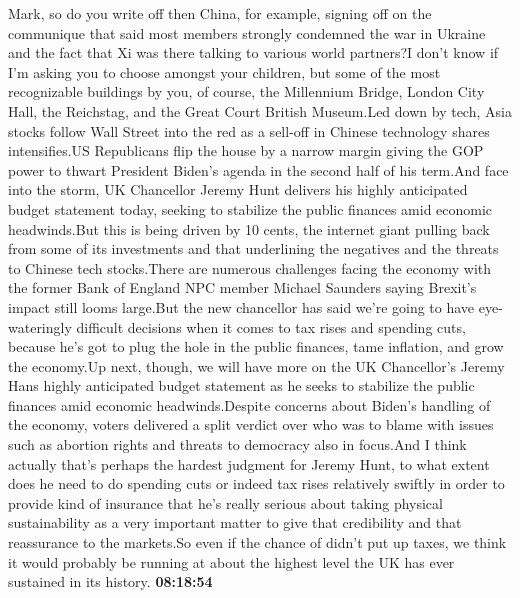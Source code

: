 \documentclass{article}%
\begin{document}
Mark, so do you write off then China, for example, signing off on the communique that said most members strongly condemned the war in Ukraine and the fact that Xi was there talking to various world partners?I don't know if I'm asking you to choose amongst your children, but some of the most recognizable buildings by you, of course, the Millennium Bridge, London City Hall, the Reichstag, and the Great Court British Museum.Led down by tech, Asia stocks follow Wall Street into the red as a sell{-}off in Chinese technology shares intensifies.US Republicans flip the house by a narrow margin giving the GOP power to thwart President Biden's agenda in the second half of his term.And face into the storm, UK Chancellor Jeremy Hunt delivers his highly anticipated budget statement today, seeking to stabilize the public finances amid economic headwinds.But this is being driven by 10 cents, the internet giant pulling back from some of its investments and that underlining the negatives and the threats to Chinese tech stocks.There are numerous challenges facing the economy with the former Bank of England NPC member Michael Saunders saying Brexit's impact still looms large.But the new chancellor has said we're going to have eye{-}wateringly difficult decisions when it comes to tax rises and spending cuts, because he's got to plug the hole in the public finances, tame inflation, and grow the economy.Up next, though, we will have more on the UK Chancellor's Jeremy Hans highly anticipated budget statement as he seeks to stabilize the public finances amid economic headwinds.Despite concerns about Biden's handling of the economy, voters delivered a split verdict over who was to blame with issues such as abortion rights and threats to democracy also in focus.And I think actually that's perhaps the hardest judgment for Jeremy Hunt, to what extent does he need to do spending cuts or indeed tax rises relatively swiftly in order to provide kind of insurance that he's really serious about taking physical sustainability as a very important matter to give that credibility and that reassurance to the markets.So even if the chance of didn't put up taxes, we think it would probably be running at about the highest level the UK has ever sustained in its history.%
\textbf{08:18:54}%
\newline%
\end{document}
